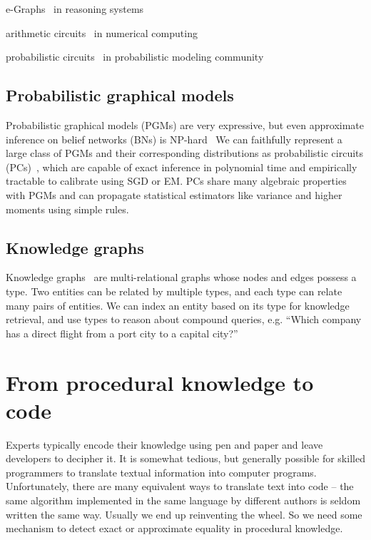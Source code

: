 \documentclass[11pt]{article}
\begin{document}
    e-Graphs~\citep{willsey2020egg} in reasoning systems

    arithmetic circuits~\citep{miller1988efficient} in numerical computing

    probabilistic circuits~\citep{choi2020probabilistic} in probabilistic modeling community

    \subsection{Probabilistic graphical models}\label{sec:pgms}

    Probabilistic graphical models (PGMs) are very expressive, but even approximate inference on belief networks (BNs) is NP-hard~\citep{dagum1993approximating} We can faithfully represent a large class of PGMs and their corresponding distributions as probabilistic circuits (PCs)~\citep{choi2020probabilistic}, which are capable of exact inference in polynomial time and empirically tractable to calibrate using SGD or EM. PCs share many algebraic properties with PGMs and can propagate statistical estimators like variance and higher moments using simple rules.

    \subsection{Knowledge graphs}

    Knowledge graphs~\citep{hogan2020knowledge} are multi-relational graphs whose nodes and edges possess a type. Two entities can be related by multiple types, and each type can relate many pairs of entities. We can index an entity based on its type for knowledge retrieval, and use types to reason about compound queries, e.g. ``Which company has a direct flight from a port city to a capital city?''

%

    \pagebreak


    \section{From procedural knowledge to code}\label{sec:applications}

    Experts typically encode their knowledge using pen and paper and leave developers to decipher it. It is somewhat tedious, but generally possible for skilled programmers to translate textual information into computer programs. Unfortunately, there are many equivalent ways to translate text into code -- the same algorithm implemented in the same language by different authors is seldom written the same way. Usually we end up reinventing the wheel. So we need some mechanism to detect exact or approximate equality in procedural knowledge.
\end{document}
